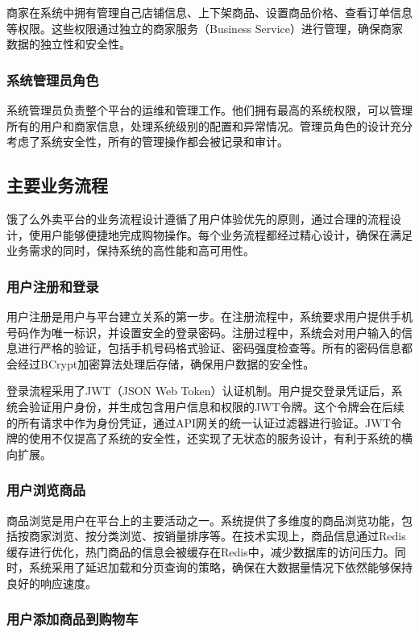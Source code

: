 \documentclass[a4paper,12pt]{article}
\begin{document}
商家在系统中拥有管理自己店铺信息、上下架商品、设置商品价格、查看订单信息等权限。这些权限通过独立的商家服务（Business Service）进行管理，确保商家数据的独立性和安全性。

\subsubsection{系统管理员角色}

系统管理员负责整个平台的运维和管理工作。他们拥有最高的系统权限，可以管理所有的用户和商家信息，处理系统级别的配置和异常情况。管理员角色的设计充分考虑了系统安全性，所有的管理操作都会被记录和审计。

\subsection{主要业务流程}

饿了么外卖平台的业务流程设计遵循了用户体验优先的原则，通过合理的流程设计，使用户能够便捷地完成购物操作。每个业务流程都经过精心设计，确保在满足业务需求的同时，保持系统的高性能和高可用性。

\subsubsection{用户注册和登录}

用户注册是用户与平台建立关系的第一步。在注册流程中，系统要求用户提供手机号码作为唯一标识，并设置安全的登录密码。注册过程中，系统会对用户输入的信息进行严格的验证，包括手机号码格式验证、密码强度检查等。所有的密码信息都会经过BCrypt加密算法处理后存储，确保用户数据的安全性。

登录流程采用了JWT（JSON Web Token）认证机制。用户提交登录凭证后，系统会验证用户身份，并生成包含用户信息和权限的JWT令牌。这个令牌会在后续的所有请求中作为身份凭证，通过API网关的统一认证过滤器进行验证。JWT令牌的使用不仅提高了系统的安全性，还实现了无状态的服务设计，有利于系统的横向扩展。

\subsubsection{用户浏览商品}

商品浏览是用户在平台上的主要活动之一。系统提供了多维度的商品浏览功能，包括按商家浏览、按分类浏览、按销量排序等。在技术实现上，商品信息通过Redis缓存进行优化，热门商品的信息会被缓存在Redis中，减少数据库的访问压力。同时，系统采用了延迟加载和分页查询的策略，确保在大数据量情况下依然能够保持良好的响应速度。

\subsubsection{用户添加商品到购物车}
\end{document}
